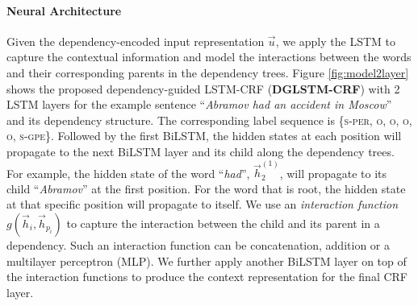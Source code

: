 \paragraph{Neural Architecture}
Given the dependency-encoded input representation $\vec{u}$, we apply the LSTM to capture the contextual information and model the interactions between the words and their corresponding parents in the dependency trees. 
Figure \ref{fig:model2layer} shows the proposed dependency-guided LSTM-CRF (\textbf{DGLSTM-CRF}) with 2 LSTM layers for the example sentence ``\textit{Abramov had an accident in Moscow}'' and its dependency structure. 
The corresponding label sequence is \{\textsc{s-per}, \textsc{o}, \textsc{o}, \textsc{o}, \textsc{o}, \textsc{s-gpe}\}. 
Followed by the first BiLSTM, the hidden states at each position will propagate to the next BiLSTM layer and its child along the dependency trees. 
For example, the hidden state of the word ``\textit{had}'', $\vec{h}_2^{(1)}$, will propagate to its child ``\textit{Abramov}'' at the first position. 
For the word that is root, the hidden state at that specific position will propagate to itself. 
We use an \textit{interaction function} $g(\vec{h}_i, \vec{h}_{p_i})$ to capture the interaction between the child and its parent in a dependency. 
Such an interaction function can be concatenation, addition or a  multilayer perceptron (MLP). 
We further apply another BiLSTM layer on top of the interaction functions to produce the context representation for the final CRF layer. 

